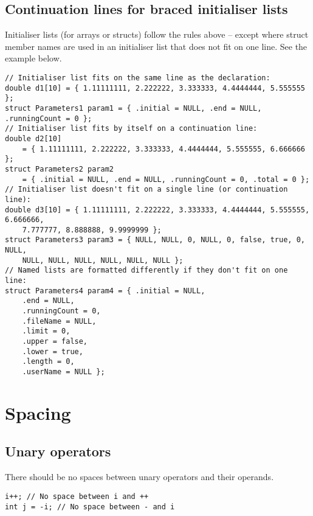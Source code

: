 \documentclass{article}
\begin{document}
\linenumbers

\subsection{Continuation lines for braced initialiser lists}
Initialiser lists (for arrays or structs) follow the rules above -- except where struct member names are used in an initialiser list that does not fit on one line. See the example below.

\nolinenumbers
{}
\begin{lstlisting}
// Initialiser list fits on the same line as the declaration:
double d1[10] = { 1.11111111, 2.222222, 3.333333, 4.4444444, 5.555555 };
struct Parameters1 param1 = { .initial = NULL, .end = NULL, .runningCount = 0 };
// Initialiser list fits by itself on a continuation line:
double d2[10]
    = { 1.11111111, 2.222222, 3.333333, 4.4444444, 5.555555, 6.666666 };
struct Parameters2 param2
    = { .initial = NULL, .end = NULL, .runningCount = 0, .total = 0 };
// Initialiser list doesn't fit on a single line (or continuation line):
double d3[10] = { 1.11111111, 2.222222, 3.333333, 4.4444444, 5.555555, 6.666666,
    7.777777, 8.888888, 9.9999999 };
struct Parameters3 param3 = { NULL, NULL, 0, NULL, 0, false, true, 0, NULL,
    NULL, NULL, NULL, NULL, NULL, NULL };
// Named lists are formatted differently if they don't fit on one line:
struct Parameters4 param4 = { .initial = NULL,
    .end = NULL,
    .runningCount = 0,
    .fileName = NULL,
    .limit = 0,
    .upper = false,
    .lower = true,
    .length = 0,
    .userName = NULL };
\end{lstlisting}
\linenumbers

\section{Spacing}

\subsection{Unary operators}
There should be no spaces between unary operators and their operands.

\nolinenumbers
{}
\begin{lstlisting}
i++; // No space between i and ++
int j = -i; // No space between - and i
\end{lstlisting}
\linenumbers
\end{document}

